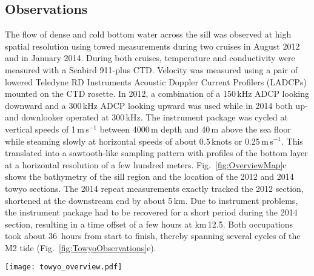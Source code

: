 \documentclass{ametsocV6.1}
\begin{document}
\subsection{Observations}\label{sec:Observations}
The flow of dense and cold bottom water across the sill was observed at high spatial resolution using towed measurements during two cruises in August 2012 and in January 2014.
During both cruises, temperature and conductivity were measured with a Seabird 911-plus CTD.
Velocity was measured using a pair of lowered Teledyne RD Instruments Acoustic Doppler Current Profilers (LADCPs) mounted on the CTD rosette.
In 2012, a combination of a 150\,kHz ADCP looking downward and a 300\,kHz ADCP looking upward was used while in 2014 both up- and downlooker operated at 300\,kHz.
The instrument package was cycled at vertical speeds of 1\,m\,s$^{-1}$ between 4000\,m depth and 40\,m above the sea floor while steaming slowly at horizontal speeds of about 0.5\,knots or 0.25\,m\,s$^{-1}$.
This translated into a sawtooth-like sampling pattern with profiles of the bottom layer at a horizontal resolution of a few hundred meters.
Fig.~\ref{fig:OverviewMap}c shows the bathymetry of the sill region and the location of the 2012 and 2014 towyo sections.
The 2014 repeat measurements exactly tracked the 2012 section, shortened at the downstream end by about 5\,km.
Due to instrument problems, the instrument package had to be recovered for a short period during the 2014 section, resulting in a time offset of a few hours at km\,12.5.
Both occupations took about 36~hours from start to finish, thereby spanning several cycles of the M2 tide (Fig.~\ref{fig:TowyoObservations}e).

\begin{figure*}
\centerline{\texttt{[image: towyo\_overview.pdf]}}
\caption{
Towyo-sections across the northern sill from 2012 (left) and 2014 (right).
({\bf a}) Potential temperature $\theta$ (color) and vertical velocity $w$ (black and white arrows showing upward/downward velocities, respectively, with scale given to lower right) with profile markers and a number of time stamps at top.
({\bf b}) Northward velocity $v$ (color) and $\sigma_4=45.94$\,kg\,m$^{-3}$ isopycnal tracing the upper interface (black contour).
({\bf c}) Vertical velocity $w$ (color) and $\sigma_4$ isopycnals at $10^{-2}$\,kg\,m$^{-3}$ intervals.
({\bf d}) Square of vertical shear $(\partial v/\partial z)^2$ (color) and isopycnals from panel c.
({\bf e}) Turbulent dissipation $\varepsilon$ from Thorpe-scale estimates.
({\bf f}) Barotropic tide prediction \citep[TPXO,][]{egberterofeeva02} for times and locations along the section.
Note the sharp transition in measured properties and tidal phase for the 2014 section at km\,12 where the instrument had to be recovered for a few hours.
}
\label{fig:TowyoObservations}
\end{figure*}
\end{document}
